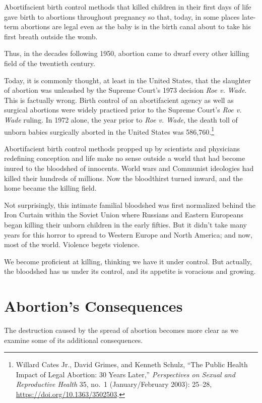 \documentclass[
]{book}
\begin{document}
Abortifacient birth control methods that killed children in their first days of life gave birth to abortions throughout pregnancy so that, today, in some places late-term abortions are legal even as the baby is in the birth canal about to take his first breath outside the womb.

Thus, in the decades following 1950, abortion came to dwarf every other killing field of the twentieth century.

Today, it is commonly thought, at least in the United States, that the slaughter of abortion was unleashed by the Supreme Court's 1973 decision \emph{Roe v. Wade}. This is factually wrong. Birth control of an abortifacient agency as well as surgical abortions were widely practiced prior to the Supreme Court's \emph{Roe v. Wade} ruling. In 1972 alone, the year prior to \emph{Roe v. Wade}, the death toll of unborn babies surgically aborted in the United States was 586,760.\footnote{Willard Cates Jr., David Grimes, and Kenneth Schulz, ``The Public Health Impact of Legal Abortion: 30 Years Later,'' \emph{Perspectives on Sexual and Reproductive Health} 35, no.~1 (January/February 2003): 25--28, \url{https://doi.org/10.1363/3502503}.}

Abortifacient birth control methods propped up by scientists and physicians redefining conception and life make no sense outside a world that had become inured to the bloodshed of innocents. World wars and Communist ideologies had killed their hundreds of millions. Now the bloodthirst turned inward, and the home became the killing field.

Not surprisingly, this intimate familial bloodshed was first normalized behind the Iron Curtain within the Soviet Union where Russians and Eastern Europeans began killing their unborn children in the early fifties. But it didn't take many years for this horror to spread to Western Europe and North America; and now, most of the world. Violence begets violence.

We become proficient at killing, thinking we have it under control. But actually, the bloodshed has us under its control, and its appetite is voracious and growing.

\hypertarget{abortions-consequences}{%
\section{Abortion's Consequences}\label{abortions-consequences}}

The destruction caused by the spread of abortion becomes more clear as we examine some of its additional consequences.
\end{document}
